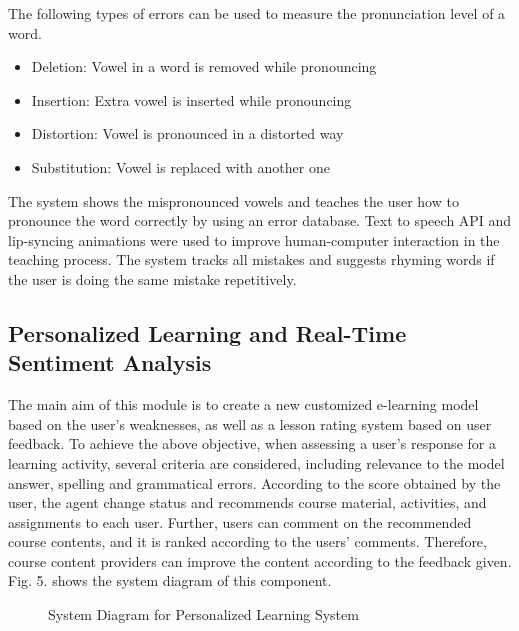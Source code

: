 \documentclass[conference]{IEEEtran}
\begin{document}
The following types of errors can be used to measure the pronunciation level of a word.

\begin{itemize}
\item Deletion: Vowel in a word is removed while pronouncing
\item Insertion: Extra vowel is inserted while pronouncing
\item Distortion: Vowel is pronounced in a distorted way
\item Substitution: Vowel is replaced with another one
\end{itemize}

The system shows the mispronounced vowels and teaches the user how to pronounce the word correctly by using an error database. Text to speech API and lip-syncing animations were used to improve human-computer interaction in the teaching process. The system tracks all mistakes and suggests rhyming words if the user is doing the same mistake repetitively.

\subsection{Personalized Learning and Real-Time Sentiment Analysis}

The main aim of this module is to create a new customized e-learning model based on the user's weaknesses, as well as a lesson rating system based on user feedback. To achieve the above objective, when assessing a user's response for a learning activity, several criteria are considered, including relevance to the model answer, spelling and grammatical errors. According to the score obtained by the user, the agent change status and recommends course material, activities, and assignments to each user. Further, users can comment on the recommended course contents, and it is ranked according to the users’ comments. Therefore, course content providers can improve the content according to the feedback given. Fig. 5. shows the system diagram of this component.

\begin{figure}[htbp]
\centerline{}
\caption{System Diagram for Personalized Learning System}
\end{figure}
\end{document}
